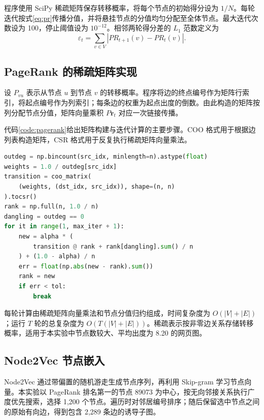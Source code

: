 \documentclass[UTF8,a4paper,12pt,fontset=windows]{ctexart}
\begin{document}
程序使用 SciPy 稀疏矩阵保存转移概率，将每个节点的初始得分设为 $1/N$。每轮迭代按式\eqref{eq:pr}传播分值，并将悬挂节点的分值均匀分配至全体节点。最大迭代次数设为 100，停止阈值设为 $10^{-12}$。相邻两轮得分差的 $L_1$ 范数定义为
\begin{equation}
\varepsilon_t=\sum_{v\in V}|PR_{t+1}(v)-PR_t(v)|.
\end{equation}


\subsection{PageRank 的稀疏矩阵实现}
设 $P_{vu}$ 表示从节点 $u$ 到节点 $v$ 的转移概率。程序将边的终点编号作为矩阵行索引，将起点编号作为列索引；每条边的权重为起点出度的倒数。由此构造的矩阵按列分配节点分值，矩阵向量乘积 $P\mathbf{r}_t$ 对应一次链接传播。

代码\ref{code:pagerank}给出矩阵构建与迭代计算的主要步骤。COO 格式用于根据边列表构造矩阵，CSR 格式用于反复执行稀疏矩阵向量乘法。
\par\noindent\begin{minipage}{\linewidth}
\begin{lstlisting}[language=Python,caption={PageRank 稀疏矩阵计算},label={code:pagerank}]
outdeg = np.bincount(src_idx, minlength=n).astype(float)
weights = 1.0 / outdeg[src_idx]
transition = coo_matrix(
    (weights, (dst_idx, src_idx)), shape=(n, n)
).tocsr()
rank = np.full(n, 1.0 / n)
dangling = outdeg == 0
for it in range(1, max_iter + 1):
    new = alpha * (
        transition @ rank + rank[dangling].sum() / n
    ) + (1.0 - alpha) / n
    err = float(np.abs(new - rank).sum())
    rank = new
    if err < tol:
        break
\end{lstlisting}
\end{minipage}\par

每轮计算由稀疏矩阵向量乘法和节点分值归约组成，时间复杂度为 $O(|V|+|E|)$；运行 $T$ 轮的总复杂度为 $O(T(|V|+|E|))$。稀疏表示按非零边关系存储转移概率，适用于本实验中节点数较大、平均出度为 8.20 的网页图。

\subsection{Node2Vec 节点嵌入}
Node2Vec 通过带偏置的随机游走生成节点序列，再利用 Skip-gram 学习节点向量\cite{node2vec}。本实验以 PageRank 排名第一的节点 89073 为中心，按无向邻接关系执行广度优先搜索，选择 1,200 个节点。遍历时对邻居编号排序；随后保留选中节点之间的原始有向边，得到包含 2,289 条边的诱导子图。
\end{document}
